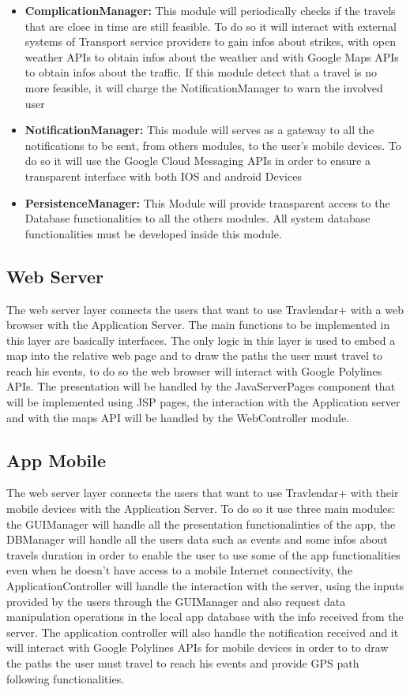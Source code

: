 \begin{itemize}
	\item \textbf{ComplicationManager:} This module will periodically checks if the travels that are close in time are still feasible. To do so it will interact with external systems of Transport service providers to gain infos about strikes, with open weather APIs to obtain infos about the weather and with Google Maps APIs to obtain infos about the traffic. If this module detect that a travel is no more feasible, it will charge the NotificationManager to warn the involved user
	\item \textbf{NotificationManager:} This module will serves as a gateway to all the notifications to be sent, from others modules, to the user's mobile devices. To do so it will use the Google Cloud Messaging APIs in order to ensure a transparent interface with both IOS and android Devices
	\item \textbf{PersistenceManager:} This Module will provide transparent access to the Database functionalities to all the others modules. All system database functionalities must be developed inside this module.
\end{itemize}
\subsection{Web Server}
\label{subsect:Web Server}
	The web server layer connects the users that want to use Travlendar+ with a web browser with the Application Server. \newline
	The main functions to be implemented in this layer are basically interfaces.
	The only logic in this layer is used to embed a map into the relative web page and to draw the paths the user must travel to reach his events, to do so the web browser will interact with Google Polylines APIs.\newline
	The presentation will be handled by the JavaServerPages component that will be implemented using JSP pages, the interaction with the Application server and with the maps API will be handled by the WebController module.

\subsection{App Mobile}
\label{subsect:App Mobile}
	The web server layer connects the users that want to use Travlendar+ with their mobile devices with the Application Server.
	To do so it use three main modules: the GUIManager will handle all the presentation functionalinties of the app, the DBManager will handle all the users data such as events and some infos about travels duration in order to enable the user to use some of the app functionalities even when he doesn't have access to a mobile Internet connectivity, the ApplicationController will handle the interaction with the server, using the inputs provided by the users through the GUIManager and also request data manipulation operations in the local app database with the info received from the server. The application controller will also handle the notification received and it will interact with Google Polylines APIs for mobile devices in order to to draw the paths the user must travel to reach his events and provide GPS path following functionalities.
	
